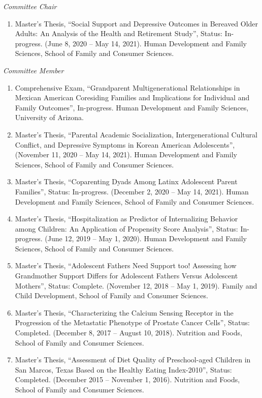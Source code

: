 \documentclass[
]{article}
\providecommand{\tightlist}{%
  \setlength{\itemsep}{0pt}\setlength{\parskip}{0pt}}
\begin{document}
\emph{Committee Chair}

\begin{enumerate}
\def\labelenumi{\arabic{enumi}.}
\tightlist
\item
  Master's Thesis, ``Social Support and Depressive Outcomes in Bereaved
  Older Adults: An Analysis of the Health and Retirement Study'',
  Status: In-progress. (June 8, 2020 -- May 14, 2021). Human Development
  and Family Sciences, School of Family and Consumer Sciences.
\end{enumerate}

\emph{Committee Member}

\begin{enumerate}
\def\labelenumi{\arabic{enumi}.}
\item
  Comprehensive Exam, ``Grandparent Multigenerational Relationships in
  Mexican American Coresiding Families and Implications for Individual
  and Family Outcomes'', In-progress. Human Development and Family
  Sciences, University of Arizona.
\item
  Master's Thesis, ``Parental Academic Socialization, Intergenerational
  Cultural Conflict, and Depressive Symptoms in Korean American
  Adolescents'', (November 11, 2020 -- May 14, 2021). Human Development
  and Family Sciences, School of Family and Consumer Sciences.
\item
  Master's Thesis, ``Coparenting Dyads Among Latinx Adolescent Parent
  Families'', Status: In-progress. (December 2, 2020 -- May 14, 2021).
  Human Development and Family Sciences, School of Family and Consumer
  Sciences.
\item
  Master's Thesis, ``Hospitalization as Predictor of Internalizing
  Behavior among Children: An Application of Propensity Score
  Analysis'', Status: In-progress. (June 12, 2019 -- May 1, 2020). Human
  Development and Family Sciences, School of Family and Consumer
  Sciences.
\item
  Master's Thesis, ``Adolescent Fathers Need Support too! Assessing how
  Grandmother Support Differs for Adolescent Fathers Versus Adolescent
  Mothers'', Status: Complete. (November 12, 2018 -- May 1, 2019).
  Family and Child Development, School of Family and Consumer Sciences.
\item
  Master's Thesis, ``Characterizing the Calcium Sensing Receptor in the
  Progression of the Metastatic Phenotype of Prostate Cancer Cells'',
  Status: Completed. (December 8, 2017 -- August 10, 2018). Nutrition
  and Foods, School of Family and Consumer Sciences.
\item
  Master's Thesis, ``Assessment of Diet Quality of Preschool-aged
  Children in San Marcos, Texas Based on the Healthy Eating
  Index-2010'', Status: Completed. (December 2015 -- November 1, 2016).
  Nutrition and Foods, School of Family and Consumer Sciences.
\end{enumerate}
\end{document}

